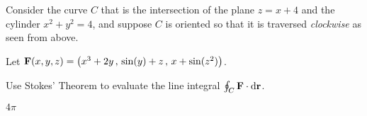 \begin{question}[M317 2015A] %
Consider the curve $C$ that is the intersection of the plane $z = x + 4$ 
and the cylinder $x^2 + y^2 = 4$, and suppose $C$ is oriented so that 
it is traversed \emph{clockwise} as seen from above.

Let $\mathbf{F}(x, y, z) = \big(x^3 + 2y\,,\, \sin(y) + z\,,\, x + \sin(z^2)\big)$.

Use Stokes' Theorem to evaluate the line integral
$\oint_C\mathbf{F}\cdot\mathrm{d}\mathbf{r}$. 
\end{question}


\begin{answer} 
$4\pi$
\end{answer}


